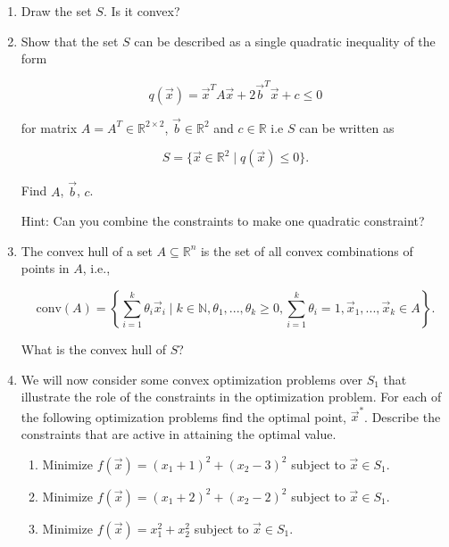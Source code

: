 \documentclass[
  12pt,
]{fphw}
\begin{document}
\begin{enumerate}

\item[(a)] Draw the set $S$. Is it convex?

\item[(b)] Show that the set $S$ can be described as a single quadratic inequality of the form

\[
q(\vec{x}) = \vec{x}^T A \vec{x} + 2\vec{b}^T \vec{x} + c \le 0
\]

for matrix $A = A^T \in \mathbb{R}^{2\times2}$, $\vec{b} \in \mathbb{R}^2$ and $c \in \mathbb{R}$ i.e $S$ can be written as

\[
S = \{ \vec{x} \in \mathbb{R}^2 \mid q(\vec{x}) \le 0 \}.
\]

Find $A$, $\vec{b}$, $c$.

Hint: Can you combine the constraints to make one quadratic constraint?

\item[(c)] The convex hull of a set $A \subseteq \mathbb{R}^n$ is the set of all convex combinations of points in $A$, i.e.,

\[
\text{conv}(A) =
\left\{
\sum_{i=1}^{k} \theta_i \vec{x}_i
\mid
k \in \mathbb{N}, \theta_1,...,\theta_k \ge 0,
\sum_{i=1}^{k}\theta_i = 1,
\vec{x}_1,...,\vec{x}_k \in A
\right\}.
\]

What is the convex hull of $S$?

\item[(d)] We will now consider some convex optimization problems over $S_1$ that illustrate the role of the constraints in the optimization problem. For each of the following optimization problems find the optimal point, $\vec{x}^\ast$. Describe the constraints that are active in attaining the optimal value.

\begin{enumerate}

\item[(i)] Minimize $f(\vec{x}) = (x_1 + 1)^2 + (x_2 - 3)^2$ subject to $\vec{x} \in S_1$.

\item[(ii)] Minimize $f(\vec{x}) = (x_1 + 2)^2 + (x_2 - 2)^2$ subject to $\vec{x} \in S_1$.

\item[(iii)] Minimize $f(\vec{x}) = x_1^2 + x_2^2$ subject to $\vec{x} \in S_1$.

\end{enumerate}
\end{enumerate}
\end{document}
